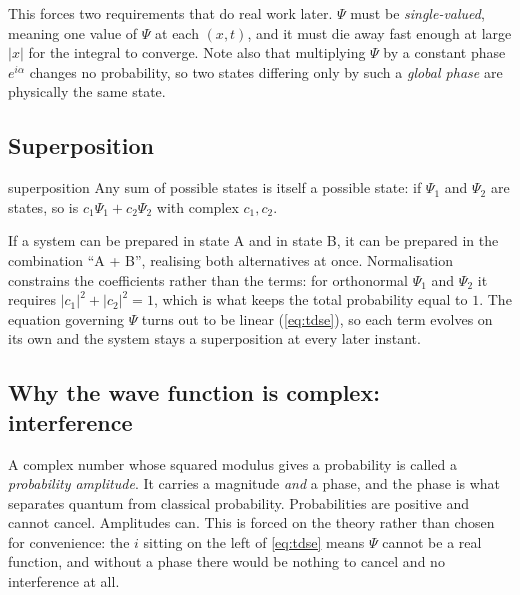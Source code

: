         This forces two requirements that do real work later. $\Psi$ must be \emph{single-valued}, meaning one value of $\Psi$ at each $(x,t)$, and it must die away fast enough at large $|x|$ for the integral to converge. Note also that multiplying $\Psi$ by a constant phase $e^{i\alpha}$ changes no probability, so two states differing only by such a \emph{global phase} are physically the same state.

    \subsection{Superposition}

        \begin{postulate}{superposition}
            \label{post:superposition}
            Any sum of possible states is itself a possible state: if $\Psi_{1}$ and $\Psi_{2}$ are states, so is $c_{1}\Psi_{1} + c_{2}\Psi_{2}$ with complex $c_{1}, c_{2}$.
        \end{postulate}

        If a system can be prepared in state A and in state B, it can be prepared in the combination \enquote{A + B}, realising both alternatives at once. Normalisation constrains the coefficients rather than the terms: for orthonormal $\Psi_{1}$ and $\Psi_{2}$ it requires $|c_{1}|^{2}+|c_{2}|^{2}=1$, which is what keeps the total probability equal to $1$. The equation governing $\Psi$ turns out to be linear (\cref{eq:tdse}), so each term evolves on its own and the system stays a superposition at every later instant.

    \subsection{Why the wave function is complex: interference}

        A complex number whose squared modulus gives a probability is called a \emph{probability amplitude}. It carries a magnitude \emph{and} a phase, and the phase is what separates quantum from classical probability. Probabilities are positive and cannot cancel. Amplitudes can. This is forced on the theory rather than chosen for convenience: the $i$ sitting on the left of \cref{eq:tdse} means $\Psi$ cannot be a real function, and without a phase there would be nothing to cancel and no interference at all.

